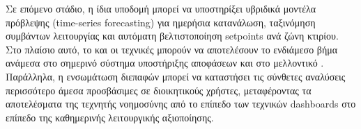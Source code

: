 Σε επόμενο στάδιο, η ίδια υποδομή μπορεί να υποστηρίξει υβριδικά μοντέλα πρόβλεψης (time-series forecasting) για ημερήσια κατανάλωση, ταξινόμηση συμβάντων λειτουργίας και αυτόματη βελτιστοποίηση setpoints ανά ζώνη κτιρίου. Στο πλαίσιο αυτό, το  και οι τεχνικές  μπορούν να αποτελέσουν το ενδιάμεσο βήμα ανάμεσα στο σημερινό σύστημα υποστήριξης αποφάσεων και στο μελλοντικό . Παράλληλα, η ενσωμάτωση διεπαφών  μπορεί να καταστήσει τις σύνθετες αναλύσεις περισσότερο άμεσα προσβάσιμες σε διοικητικούς χρήστες, μεταφέροντας τα αποτελέσματα της τεχνητής νοημοσύνης από το επίπεδο των τεχνικών dashboards στο επίπεδο της καθημερινής λειτουργικής αξιοποίησης.

